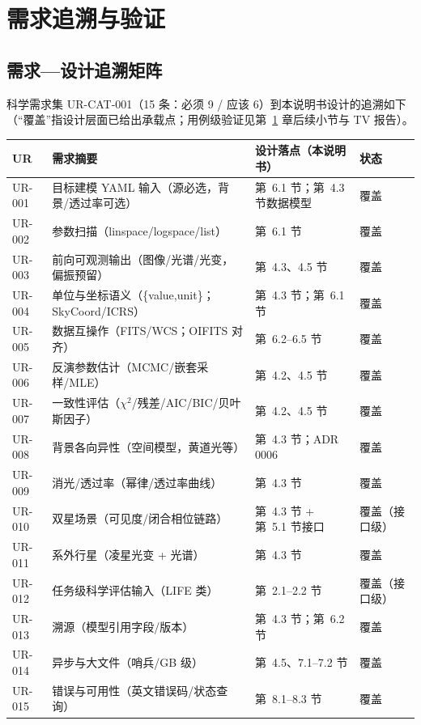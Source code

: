 \section{需求追溯与验证}
\label{sec:traceability}

\subsection{需求—设计追溯矩阵}

科学需求集 UR-CAT-001（15 条：必须 9 / 应该 6）到本说明书设计的追溯如下
（“覆盖”指设计层面已给出承载点；用例级验证见第~\ref{sec:traceability} 章后续小节与 TV 报告）。

\begin{longtable}{p{1.5cm}p{4.6cm}p{6.0cm}p{2.6cm}}
\toprule
UR & 需求摘要 & 设计落点（本说明书） & 状态 \\
\midrule
\endhead
UR-001 & 目标建模 YAML 输入（源必选，背景/透过率可选） & 第~6.1 节；第~4.3 节数据模型 & 覆盖 \\
UR-002 & 参数扫描（linspace/logspace/list） & 第~6.1 节 & 覆盖 \\
UR-003 & 前向可观测输出（图像/光谱/光变，偏振预留） & 第~4.3、4.5 节 & 覆盖 \\
UR-004 & 单位与坐标语义（\{value,unit\}；SkyCoord/ICRS） & 第~4.3 节；第~6.1 节 & 覆盖 \\
UR-005 & 数据互操作（FITS/WCS；OIFITS 对齐） & 第~6.2--6.5 节 & 覆盖 \\
UR-006 & 反演参数估计（MCMC/嵌套采样/MLE） & 第~4.2、4.5 节 & 覆盖 \\
UR-007 & 一致性评估（$\chi^2$/残差/AIC/BIC/贝叶斯因子） & 第~4.2、4.5 节 & 覆盖 \\
UR-008 & 背景各向异性（空间模型，黄道光等） & 第~4.3 节；ADR 0006 & 覆盖 \\
UR-009 & 消光/透过率（幂律/透过率曲线） & 第~4.3 节 & 覆盖 \\
UR-010 & 双星场景（可见度/闭合相位链路） & 第~4.3 节 + 第~5.1 节接口 & 覆盖（接口级） \\
UR-011 & 系外行星（凌星光变 + 光谱） & 第~4.3 节 & 覆盖 \\
UR-012 & 任务级科学评估输入（LIFE 类） & 第~2.1--2.2 节 & 覆盖（接口级） \\
UR-013 & 溯源（模型引用字段/版本） & 第~4.3 节；第~6.2 节 & 覆盖 \\
UR-014 & 异步与大文件（哨兵/GB 级） & 第~4.5、7.1--7.2 节 & 覆盖 \\
UR-015 & 错误与可用性（英文错误码/状态查询） & 第~8.1--8.3 节 & 覆盖 \\
\bottomrule
\end{longtable}

